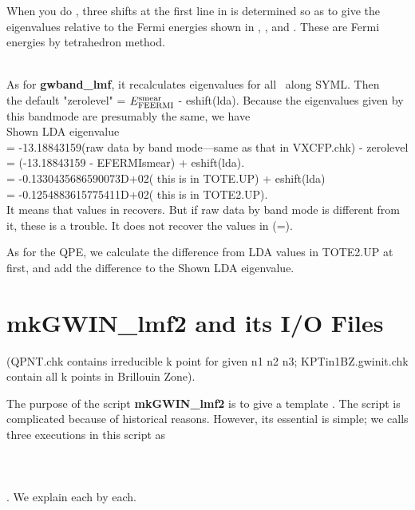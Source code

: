 {\begin{enumerate}
When you do , three shifts at the first line in 
is determined so as to give the eigenvalues relative to the Fermi
energies shown in , , and . 
These are Fermi energies by tetrahedron method.

\end{enumerate}

~\\

As for {\bf gwband\_lmf}, it recalculates eigenvalues for all \bfq \ along SYML.
Then\\ the default "zerolevel" = $E_{\rm FEERMI}^{\rm smear}$ - eshift(lda). 
Because the eigenvalues given by this bandmode are presumably the same, we have\\
Shown LDA eigenvalue\\
 =  -13.18843159(raw data by band mode---same as that in VXCFP.chk) - zerolevel\\
 = (-13.18843159 - EFERMIsmear) + eshift(lda).\\
 =  -0.1330435686590073D+02( this is in TOTE.UP) + eshift(lda)\\
 =  -0.1254883615775411D+02( this is in TOTE2.UP).\\

It means that values in  recovers.
But if raw data by band mode is different from it, these is a trouble. 
It does not recover the values in (=).

As for the QPE, we calculate the difference from LDA values
in TOTE2.UP at first, and add the difference to the Shown LDA eigenvalue.







\newpage
\section{mkGWIN\_lmf2 and its I/O Files}
(QPNT.chk contains irreducible k
point for given n1 n2 n3; KPTin1BZ.gwinit.chk contain all k points in
Brillouin Zone).

The purpose of the script {\bf mkGWIN\_lmf2} is to give a template .
The script is complicated because of historical reasons. 
However, its essential is simple;
we calls three executions in this script as\\
\\
\\
\\
. We explain each by each.

}
